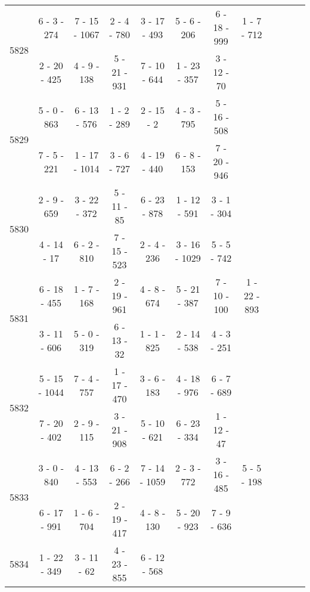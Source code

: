 \begin{longtable}{c | c | c | c | c | c | c | c | c | c | c | c}
\multirow{2}{*}{5828}
& 6 - 3 - 274
&
7 - 15 - 1067
&
2 - 4 - 780
&
3 - 17 - 493
&
5 - 6 - 206
&
6 - 18 - 999
&
1 - 7 - 712
\\* \space
&
2 - 20 - 425
&
4 - 9 - 138
&
5 - 21 - 931
&
7 - 10 - 644
&
1 - 23 - 357
&
3 - 12 - 70
&\space\\\hline
\multirow{2}{*}{5829}
& 5 - 0 - 863
&
6 - 13 - 576
&
1 - 2 - 289
&
2 - 15 - 2
&
4 - 3 - 795
&
5 - 16 - 508
&\space\\* \space
&
7 - 5 - 221
&
1 - 17 - 1014
&
3 - 6 - 727
&
4 - 19 - 440
&
6 - 8 - 153
&
7 - 20 - 946
&\space\\\hline
\multirow{2}{*}{5830}
& 2 - 9 - 659
&
3 - 22 - 372
&
5 - 11 - 85
&
6 - 23 - 878
&
1 - 12 - 591
&
3 - 1 - 304
&\space\\* \space
&
4 - 14 - 17
&
6 - 2 - 810
&
7 - 15 - 523
&
2 - 4 - 236
&
3 - 16 - 1029
&
5 - 5 - 742
&\space\\\hline
\multirow{2}{*}{5831}
& 6 - 18 - 455
&
1 - 7 - 168
&
2 - 19 - 961
&
4 - 8 - 674
&
5 - 21 - 387
&
7 - 10 - 100
&
1 - 22 - 893
\\* \space
&
3 - 11 - 606
&
5 - 0 - 319
&
6 - 13 - 32
&
1 - 1 - 825
&
2 - 14 - 538
&
4 - 3 - 251
&\space\\\hline
\multirow{2}{*}{5832}
& 5 - 15 - 1044
&
7 - 4 - 757
&
1 - 17 - 470
&
3 - 6 - 183
&
4 - 18 - 976
&
6 - 7 - 689
&\space\\* \space
&
7 - 20 - 402
&
2 - 9 - 115
&
3 - 21 - 908
&
5 - 10 - 621
&
6 - 23 - 334
&
1 - 12 - 47
&\space\\\hline
\multirow{2}{*}{5833}
& 3 - 0 - 840
&
4 - 13 - 553
&
6 - 2 - 266
&
7 - 14 - 1059
&
2 - 3 - 772
&
3 - 16 - 485
&
5 - 5 - 198
\\* \space
&
6 - 17 - 991
&
1 - 6 - 704
&
2 - 19 - 417
&
4 - 8 - 130
&
5 - 20 - 923
&
7 - 9 - 636
&\space\\\hline
\multirow{2}{*}{5834}
& 1 - 22 - 349
&
3 - 11 - 62
&
4 - 23 - 855
&
6 - 12 - 568

\end{longtable}
